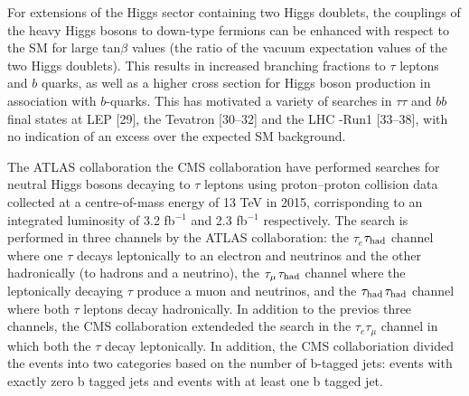 For extensions of the Higgs sector containing two Higgs doublets, the couplings of the heavy Higgs bosons to down-type fermions can be enhanced with respect to the SM for large tan$\beta$ values (the ratio of the vacuum expectation values of the two Higgs doublets).  This results in increased branching fractions to $\tau$ leptons and $b$ quarks, as well as a higher cross section for Higgs boson production in association with $b$-quarks. This has motivated a variety of searches in $\tau\tau$ and $bb$ final states at LEP [29], the Tevatron [30–32] and the LHC -Run1 [33–38], with no indication of an excess over the expected SM background.


The ATLAS collaboration the CMS collaboration have
performed searches for neutral Higgs bosons decaying to $\tau$ leptons using proton--proton collision data collected at a centre-of-mass energy of 13 TeV in 2015, corrisponding to an integrated luminosity
of 3.2 fb$^{−1}$  and 2.3 fb$^{−1}$ respectively. The search is performed in three channels by the  ATLAS collaboration: the $\tau_{e}$$\tau_{\rm had}$ channel where one $\tau$ decays leptonically to an electron and neutrinos and the
other hadronically (to hadrons and a neutrino),  
the $\tau_{\rm \mu}$$\tau_{\rm had}$ channel where the leptonically decaying $\tau$ produce a muon and neutrinos,  and  the  $\tau_{\rm had}$$\tau_{\rm had}$ channel where both $\tau$ leptons decay hadronically. 
In addition to the previos three channels, the CMS collaboration extendeded the search in the $\tau_{e}\tau_{\mu}$ channel  in which both the $\tau$ decay leptonically.
In addition, the CMS collaboriation divided the events into two categories based on the number of b-tagged jets: events with  exactly zero b tagged jets and events with at least one b tagged jet.

